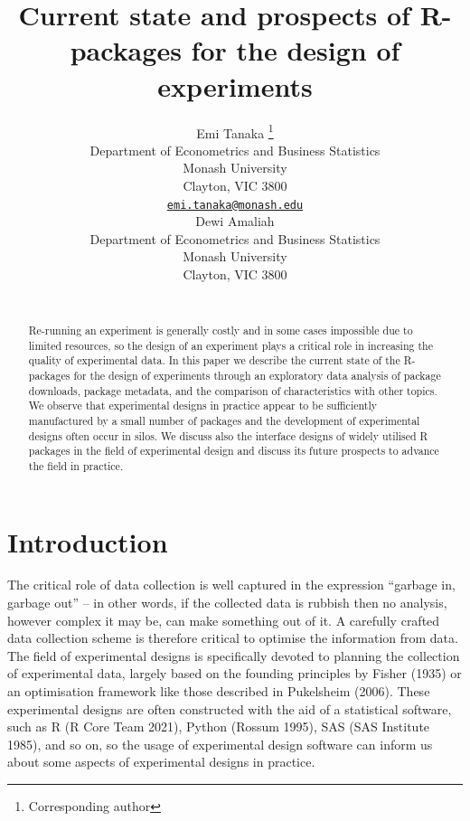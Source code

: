\documentclass{article}
\title{Current state and prospects of R-packages for the design of
experiments}
\author{
    Emi Tanaka
    \thanks{Corresponding author}
   \\
    Department of Econometrics and Business Statistics \\
    Monash University \\
  Clayton, VIC 3800 \\
  \texttt{\href{mailto:emi.tanaka@monash.edu}{\nolinkurl{emi.tanaka@monash.edu}}} \\
   \And
    Dewi Amaliah
   \\
    Department of Econometrics and Business Statistics \\
    Monash University \\
  Clayton, VIC 3800 \\
  \texttt{} \\
  }
\begin{document}
\maketitle


\begin{abstract}
Re-running an experiment is generally costly and in some cases
impossible due to limited resources, so the design of an experiment
plays a critical role in increasing the quality of experimental data. In
this paper we describe the current state of the R-packages for the
design of experiments through an exploratory data analysis of package
downloads, package metadata, and the comparison of characteristics with
other topics. We observe that experimental designs in practice appear to
be sufficiently manufactured by a small number of packages and the
development of experimental designs often occur in silos. We discuss
also the interface designs of widely utilised R packages in the field of
experimental design and discuss its future prospects to advance the
field in practice.
\end{abstract}


\hypertarget{introduction}{%
\section{Introduction}\label{introduction}}

The critical role of data collection is well captured in the expression
``garbage in, garbage out'' -- in other words, if the collected data is
rubbish then no analysis, however complex it may be, can make something
out of it. A carefully crafted data collection scheme is therefore
critical to optimise the information from data. The field of
experimental designs is specifically devoted to planning the collection
of experimental data, largely based on the founding principles by Fisher
(1935) or an optimisation framework like those described in Pukelsheim
(2006). These experimental designs are often constructed with the aid of
a statistical software, such as R (R Core Team 2021), Python (Rossum
1995), SAS (SAS Institute 1985), and so on, so the usage of experimental
design software can inform us about some aspects of experimental designs
in practice.
\end{document}
